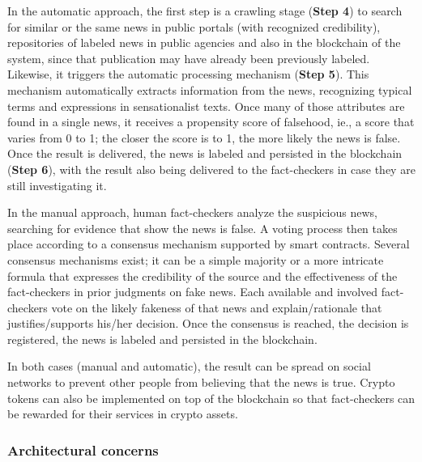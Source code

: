 In the automatic approach, the first step is a crawling stage (\textbf{Step 4}) to search for similar or the same news in public portals (with recognized credibility), repositories of labeled news in public agencies and also in the blockchain of the system, since that publication may have already been previously labeled. Likewise, it triggers the automatic processing mechanism (\textbf{Step 5}). This mechanism automatically extracts information from the news, recognizing typical terms and expressions in sensationalist texts. Once many of those attributes are found in a single news, it receives a propensity score of falsehood, ie., a score that varies from 0 to 1; the closer the score is to 1, the more likely the news is false. Once the result is delivered, the news is labeled and persisted in the blockchain (\textbf{Step 6}), with the result also being delivered to the fact-checkers in case they are still investigating it.

In the manual approach, human fact-checkers analyze the suspicious news, searching for evidence that show the news is false. A voting process then takes place according to a consensus mechanism supported by smart contracts. Several consensus mechanisms exist; it can be a simple majority or a more intricate formula that expresses the credibility of the source and the effectiveness of the fact-checkers in prior judgments on fake news. Each available and involved fact-checkers vote on the likely fakeness of that news and explain/rationale that justifies/supports his/her decision. Once the consensus is reached, the decision is registered, the news is labeled and persisted in the blockchain.

In both cases (manual and automatic), the result can be spread on social networks to prevent other people from believing that the news is true. %
Crypto tokens can also be implemented on top of the blockchain so that fact-checkers can be rewarded for their services in crypto assets.

\subsubsection{Architectural concerns}


